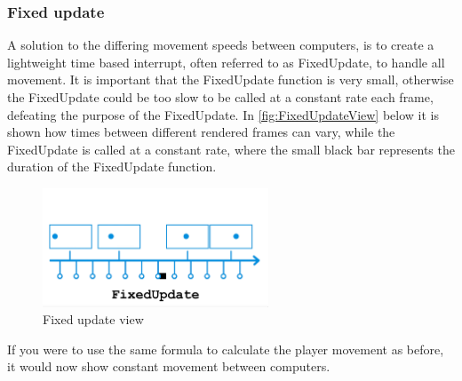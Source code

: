\documentclass{article} %
\begin{document}
\subsubsection{Fixed update}
A solution to the differing movement speeds between computers, is to create a lightweight time based interrupt, often referred to as FixedUpdate, to handle all movement.
It is important that the FixedUpdate function is very small, otherwise the FixedUpdate could be too slow to be called at a constant rate each frame, defeating the purpose of the FixedUpdate.
In \autoref{fig:FixedUpdateView} below it is shown how times between different rendered frames can vary, while the FixedUpdate is called at a constant rate, where the small black bar represents the duration of the FixedUpdate function.
\begin{figure}[h!]
	\centering
	\includegraphics[width=0.6\textwidth]{fixed_update_explanation.png}
	\caption{Fixed update view}
	\label{fig:FixedUpdateView}
\end{figure}
\newline
If you were to use the same formula to calculate the player movement as before, it would now show constant movement between computers.
\end{document}
